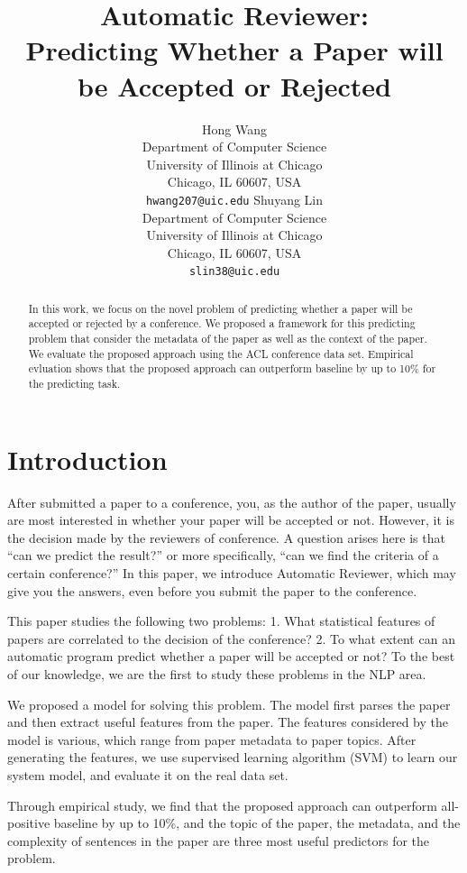\documentclass[11pt,letterpaper]{article}
\title{Automatic Reviewer: \\Predicting Whether a Paper will be Accepted or Rejected}
\author{Hong Wang\\
	    Department of Computer Science\\
	    University of Illinois at Chicago\\
	    Chicago, IL 60607, USA\\
	    {\tt hwang207@uic.edu}
	  \And
	Shuyang Lin\\
  	 Department of Computer Science\\
	    University of Illinois at Chicago\\
	    Chicago, IL 60607, USA\\
	  {\tt slin38@uic.edu}}
\date{}
\begin{document}
\maketitle
\begin{abstract}
In this work, we focus on the novel problem of predicting whether a paper will be accepted or rejected by a conference.
We proposed a framework for this predicting problem that consider the metadata of the paper as well as the context of the paper.
We evaluate the proposed approach using the ACL conference data set.
Empirical evluation shows that the proposed approach can outperform baseline by up to 10\% for the predicting task.

\end{abstract}

\section{Introduction}
After submitted a paper to a conference, you, as the author of the paper, usually are most interested in whether your paper will be accepted or not. However, it is the decision made by the reviewers of conference. A question arises here is that ``can we predict the result?'' or more specifically, ``can we find the criteria of a certain conference?'' In this paper, we introduce Automatic Reviewer, which may give you the answers, even before you submit the paper to the conference. 

This paper studies the following two problems: 1. What statistical features of papers are correlated to the decision of the conference? 2. To what extent can an automatic program predict whether a paper will be accepted or not?
To the best of our knowledge, we are the first to study these problems in the NLP area.

We proposed a model for solving this problem.
The model first parses the paper and then extract useful features from the paper.
The features considered by the model is various, which range from paper metadata to paper topics. 
After generating the features, 
we use supervised learning algorithm (SVM) to learn our system model, 
and evaluate it on the real data set.

Through empirical study, 
we find that the proposed approach can outperform all-positive baseline by up to 10\%,
and the topic of the paper, the metadata, and the complexity of sentences in the paper are three most useful predictors for the problem.
\end{document}
